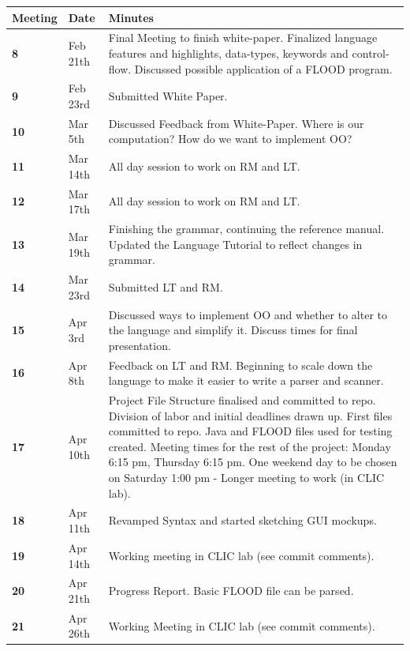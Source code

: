 \documentclass[12pt]{report}
\begin{document}
\begin{flushleft}
\begin{singlespace}
\begin{tabular}{ | p{2cm} | p{1.8cm} | p{12cm} | }
\hline
\textbf{Meeting} & \textbf{Date} & \textbf{Minutes}\\
\hline
\textbf{8} & Feb 21th & Final Meeting to finish white-paper. Finalized language features and highlights, data-types, keywords and control-flow. Discussed possible application of a FLOOD program.\\
\hline
\textbf{9} & Feb 23rd & Submitted White Paper.\\
\hline
\textbf{10} & Mar 5th & Discussed Feedback from White-Paper. Where is our computation? How do we want to implement OO?\\
\hline
\textbf{11} & Mar 14th & All day session to work on RM and LT.\\
\hline
\textbf{12} & Mar 17th & All day session to work on RM and LT.\\
\hline
\textbf{13} & Mar 19th & Finishing the grammar, continuing the reference manual. Updated the Language Tutorial to reflect changes in grammar.\\
\hline
\textbf{14} & Mar 23rd & Submitted LT and RM.\\
\hline
\textbf{15} & Apr 3rd & Discussed ways to implement OO and whether to alter to the language and simplify it. Discuss times for final presentation.\\
\hline
\textbf{16} & Apr 8th & Feedback on LT and RM. Beginning to scale down the language to make it easier to write a parser and scanner.\\
\hline
\textbf{17} & Apr 10th & Project File Structure finalised and committed to repo. Division of labor and initial deadlines drawn up. First files committed to repo. Java and FLOOD files used for testing created. Meeting times for the rest of the project: Monday 6:15 pm, Thursday 6:15 pm. One weekend day to be chosen on Saturday 1:00 pm - Longer meeting to work (in CLIC lab).\\
\hline
\textbf{18} & Apr 11th & Revamped Syntax and started sketching GUI mockups.\\
\hline
\textbf{19} & Apr 14th & Working meeting in CLIC lab (see commit comments).\\
\hline
\textbf{20} & Apr 21th & Progress Report. Basic FLOOD file can be parsed.\\
\hline
\textbf{21} & Apr 26th & Working Meeting in CLIC lab (see commit comments).\\

\end{tabular}
\end{singlespace}
\end{flushleft}
\end{document}
